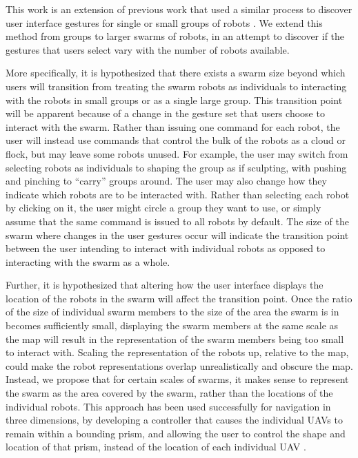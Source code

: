This work is an extension of previous work that used a similar process to discover user interface gestures for single or small groups of robots \citep{Micire:2009:ANG:1731903.1731912}. We extend this method from groups to larger swarms of robots, in an attempt to discover if the gestures that users select vary with the number of robots available.

More specifically, it is hypothesized that there exists a swarm size beyond which users will transition from treating the swarm robots as individuals to interacting with the robots in small groups or as a single large group. 
This transition point will be apparent because of a change in the gesture set that users choose to interact with the swarm. 
Rather than issuing one command for each robot, the user will instead use commands that control the bulk of the robots as a cloud or flock, but may leave some robots unused. 
For example, the user may switch from selecting robots as individuals to shaping the group as if sculpting, with pushing and pinching to ``carry'' groups around. 
The user may also change how they indicate which robots are to be interacted with. 
Rather than selecting each robot by clicking on it, the user might circle a group they want to use, or simply assume that the same command is issued to all robots by default. 
The size of the swarm where changes in the user gestures occur will indicate the transition point between the user intending to interact with individual robots as opposed to interacting with the swarm as a whole. 

Further, it is hypothesized that altering how the user interface displays the location of the robots in the swarm will affect the transition point.
Once the ratio of the size of individual swarm members to the size of the area the swarm is in becomes sufficiently small, displaying the swarm members at the same scale as the map will result in the representation of the swarm members being too small to interact with. 
Scaling the representation of the robots up, relative to the map, could make the robot representations overlap unrealistically and obscure the map. 
Instead, we propose that for certain scales of swarms, it makes sense to represent the swarm as the area covered by the swarm, rather than the locations of the individual robots.
This approach has been used successfully for navigation in three dimensions, by developing a controller that causes the individual UAVs to remain within a bounding prism, and allowing the user to control the shape and location of that prism, instead of the location of each individual UAV \citep{ayanian2014controlling}.

